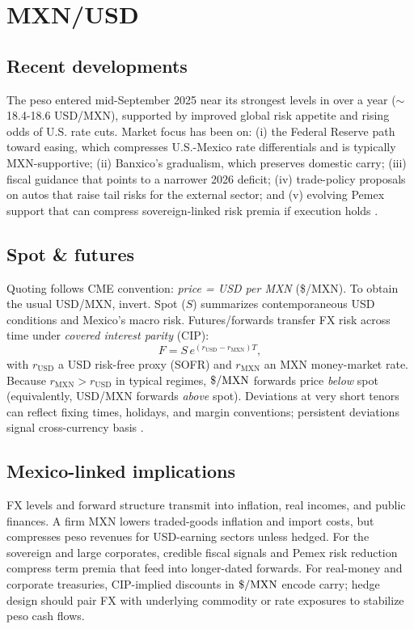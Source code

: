 \documentclass[11pt,a4paper]{article} %
\let\oldsection\section
\renewcommand{\section}{%
    \clearpage
    \thispagestyle{myfancy}%
    \oldsection
  }
\begin{document}
\section{MXN/USD}

\subsection{Recent developments}
The peso entered mid-September 2025 near its strongest levels in over a year (\(\sim\)18.4-18.6 USD/MXN), supported by improved global risk appetite and rising odds of U.S. rate cuts. Market focus has been on: (i) the Federal Reserve path toward easing, which compresses U.S.-Mexico rate differentials and is typically MXN-supportive; (ii) Banxico's gradualism, which preserves domestic carry; (iii) fiscal guidance that points to a narrower 2026 deficit; (iv) trade-policy proposals on autos that raise tail risks for the external sector; and (v) evolving Pemex support that can compress sovereign-linked risk premia if execution holds \citep{reuters_usdmxn_quote,reuters_mx_markets_11sep,reuters_mx_markets_12sep,reuters_fed_poll_2025,reuters_cenbank_graphic_2025,reuters_banxico_jun26_2025,banxico_calendar_2025,reuters_budget_2026_2025,reuters_tariffs_autos_2025,reuters_pemex_plan_2025,reuters_fitch_pemex_2025}.

\subsection{Spot \& futures}
Quoting follows CME convention: \emph{price = USD per MXN} (\$/MXN). To obtain the usual USD/MXN, invert. Spot (\(S\)) summarizes contemporaneous USD conditions and Mexico's macro risk. Futures/forwards transfer FX risk across time under \emph{covered interest parity} (CIP):
\[
F = S\,e^{(r_{\mathrm{USD}}-r_{\mathrm{MXN}})T},
\]
with \(r_{\mathrm{USD}}\) a USD risk-free proxy (SOFR) and \(r_{\mathrm{MXN}}\) an MXN money-market rate. Because \(r_{\mathrm{MXN}}>r_{\mathrm{USD}}\) in typical regimes, \(\$/{\rm MXN}\) forwards price \emph{below} spot (equivalently, USD/MXN forwards \emph{above} spot). Deviations at very short tenors can reflect fixing times, holidays, and margin conventions; persistent deviations signal cross-currency basis \citep{bis_cip_2016,bis_cip_2024,frbny_sofr,frbny_sofr_index,cme_fx_overview,cme_mxn_product,cme_mxn_rulebook}.

\subsection{Mexico-linked implications}
FX levels and forward structure transmit into inflation, real incomes, and public finances. A firm MXN lowers traded-goods inflation and import costs, but compresses peso revenues for USD-earning sectors unless hedged. For the sovereign and large corporates, credible fiscal signals and Pemex risk reduction compress term premia that feed into longer-dated forwards. For real-money and corporate treasuries, CIP-implied discounts in \(\$/{\rm MXN}\) encode carry; hedge design should pair FX with underlying commodity or rate exposures to stabilize peso cash flows.
\end{document}
